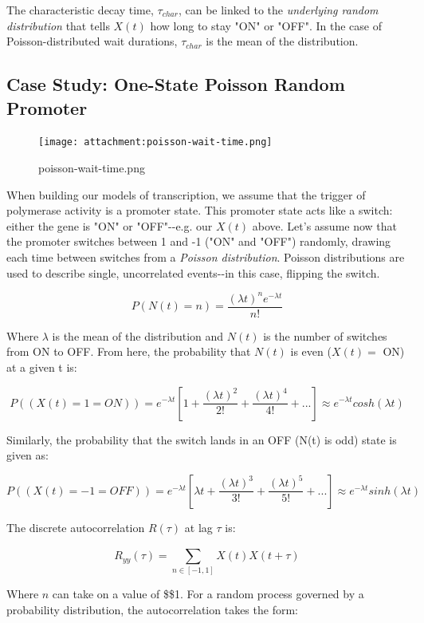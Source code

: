 \documentclass[11pt]{article}
\begin{document}
The characteristic decay time, \(\tau_{char}\), can be linked to the
\emph{underlying random distribution} that tells \(X(t)\) how long to
stay "ON" or "OFF". In the case of Poisson-distributed wait durations,
\(\tau_{char}\) is the mean of the distribution.

    \subsection{Case Study: One-State Poisson Random
Promoter}\label{case-study-one-state-poisson-random-promoter}

\begin{figure}
\centering
\texttt{[image: attachment:poisson-wait-time.png]}
\caption{poisson-wait-time.png}
\end{figure}

When building our models of transcription, we assume that the trigger of
polymerase activity is a promoter state. This promoter state acts like a
switch: either the gene is "ON" or "OFF"-\/-e.g. our \(X(t)\) above.
Let's assume now that the promoter switches between 1 and -1 ("ON" and
"OFF") randomly, drawing each time between switches from a \emph{Poisson
distribution}. Poisson distributions are used to describe single,
uncorrelated events-\/-in this case, flipping the switch.

\[P(N(t) = n) = \frac{(\lambda t)^{n}e^{-\lambda t}}{n!} \]

Where \(\lambda\) is the mean of the distribution and \(N(t)\) is the
number of switches from ON to OFF. From here, the probability that
\(N(t)\) is even (\(X(t)=\) ON) at a given t is:

\[P((X(t) = 1 = ON)) = e^{-\lambda t}[1 + \frac{(\lambda t)^2}{2!} + \frac{(\lambda t)^4}{4!} + ...] \approx e^{-\lambda t}cosh(\lambda t)\]

Similarly, the probability that the switch lands in an OFF (N(t) is odd)
state is given as:

\[P((X(t) = -1 = OFF)) = e^{-\lambda t}[\lambda t + \frac{(\lambda t)^3}{3!} + \frac{(\lambda t)^5}{5!} + ...] \approx e^{-\lambda t}sinh(\lambda t)\]

    The discrete autocorrelation \(R(\tau)\) at lag \(\tau\) is:

\[ R_{yy}(\tau) = \sum_{n\in [-1, 1]}^{} {X(t)X(t+\tau)}\]

Where \(n\) can take on a value of \$\pm\$1. For a random process
governed by a probability distribution, the autocorrelation takes the
form:
\end{document}
